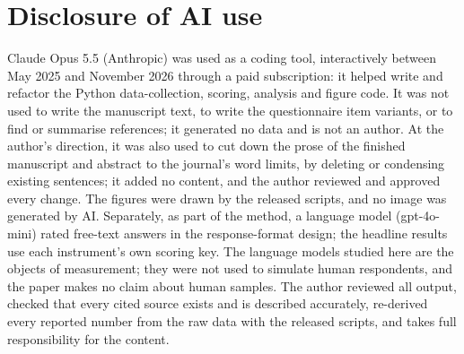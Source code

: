 \documentclass[12pt]{article}
\begin{document}
\section*{Disclosure of AI use}
Claude Opus 5.5 (Anthropic) was used as a coding tool, interactively between May 2025 and November 2026 through a paid subscription: it helped write and refactor the Python data-collection, scoring, analysis and figure code. It was not used to write the manuscript text, to write the questionnaire item variants, or to find or summarise references; it generated no data and is not an author. At the author's direction, it was also used to cut down the prose of the finished manuscript and abstract to the journal's word limits, by deleting or condensing existing sentences; it added no content, and the author reviewed and approved every change. The figures were drawn by the released scripts, and no image was generated by AI. Separately, as part of the method, a language model (gpt-4o-mini) rated free-text answers in the response-format design; the headline results use each instrument's own scoring key. The language models studied here are the objects of measurement; they were not used to simulate human respondents, and the paper makes no claim about human samples. The author reviewed all output, checked that every cited source exists and is described accurately, re-derived every reported number from the raw data with the released scripts, and takes full responsibility for the content.
\fi

\clearpage


\end{document}
